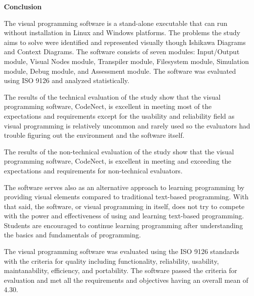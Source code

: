 \flushleft
\textbf{Conclusion}
\justifying

\parx
The visual programming software is a stand-alone executable that can run
without installation in Linux and Windows platforms. The problems the study
aims to solve were identified and represented visually though Ishikawa Diagrams
and Context Diagrams. The software consists of seven modules: Input/Output
module, Visual Nodes module, Transpiler module, Filesystem module, Simulation
module, Debug module, and Assessment module. The software was evaluated using
ISO 9126 and analyzed statistically.

\parx
The results of the technical evaluation of the study show that the visual programming software,
CodeNect, is excellent in meeting most of the expectations and requirements except
for the usability and reliability field as visual programming is relatively uncommon
and rarely used so the evaluators had trouble figuring out the environment and the
software itself.

\parx
The results of the non-technical evaluation of the study show that the visual programming software,
CodeNect, is excellent in meeting and exceeding the expectations and requirements
for non-technical evaluators.

\parx
The software serves also as an alternative approach to learning programming by
providing visual elements compared to traditional text-based programming. With
that said, the software, or visual programming in itself, does not try to
compete with the power and effectiveness of using and learning text-based
programming. Students are encouraged to continue learning programming after
understanding the basics and fundamentals of programming.

\parx
The visual programming software was evaluated using the ISO 9126 standards with the
criteria for quality including functionality, reliability, usability, maintanability,
efficiency, and portability. The software passed the criteria for evaluation and met
all the requirements and objectives having an overall mean of 4.30.
